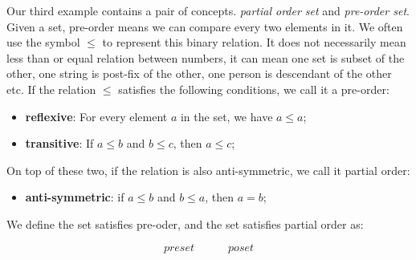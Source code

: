 \documentclass[b5paper]{article}
\begin{document}
 
 
Our third example contains a pair of concepts. {\em partial order set} and {\em pre-order set}. Given a set, pre-order means we can compare every two elements in it. We often use the symbol $\leq$ to represent this binary relation. It does not necessarily mean less than or equal relation between numbers, it can mean one set is subset of the other, one string is post-fix of the other, one person is descendant of the other etc. If the relation $\leq$ satisfies the following conditions, we call it a pre-order:

\begin{itemize}
\item \textbf{reflexive}: For every element $a$ in the set, we have $a \leq a$;
\item \textbf{transitive}: If $a \leq b$ and $b \leq c$, then $a \leq c$;
\end{itemize}

On top of these two, if the relation is also anti-symmetric, we call it partial order:

\begin{itemize}
\item \textbf{anti-symmetric}: if $a \leq b$ and $b \leq a$, then $a = b$;
\end{itemize}

We define the set satisfies pre-oder, and the set satisfies partial order as:

\[
preset \quad \quad \quad poset
\]
\end{document}
